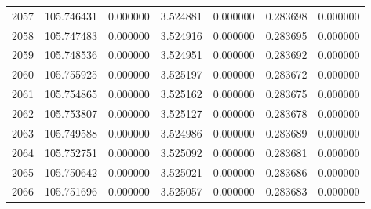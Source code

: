 \begin{tabular}{rrrrrrr}
2057 & 105.746431 &    0.000000 &  3.524881 &    0.000000 &    0.283698 &  0.000000 \\
2058 & 105.747483 &    0.000000 &  3.524916 &    0.000000 &    0.283695 &  0.000000 \\
2059 & 105.748536 &    0.000000 &  3.524951 &    0.000000 &    0.283692 &  0.000000 \\
2060 & 105.755925 &    0.000000 &  3.525197 &    0.000000 &    0.283672 &  0.000000 \\
2061 & 105.754865 &    0.000000 &  3.525162 &    0.000000 &    0.283675 &  0.000000 \\
2062 & 105.753807 &    0.000000 &  3.525127 &    0.000000 &    0.283678 &  0.000000 \\
2063 & 105.749588 &    0.000000 &  3.524986 &    0.000000 &    0.283689 &  0.000000 \\
2064 & 105.752751 &    0.000000 &  3.525092 &    0.000000 &    0.283681 &  0.000000 \\
2065 & 105.750642 &    0.000000 &  3.525021 &    0.000000 &    0.283686 &  0.000000 \\
2066 & 105.751696 &    0.000000 &  3.525057 &    0.000000 &    0.283683 &  0.000000 \\
\bottomrule
\end{tabular}
